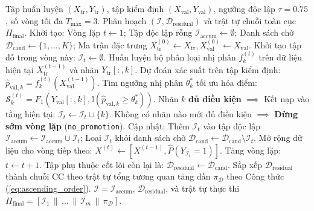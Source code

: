 \documentclass[11pt,a4paper]{article}
\begin{document}
\begin{algorithm}[htbp]
\caption{Quy trình Phân tầng Bóc tách Dữ liệu (Stratified Peeling Partitioning v5.1)}
\label{alg:stratified_peeling}
\begin{algorithmic}[1]
\REQUIRE Tập huấn luyện $(X_{\text{tr}}, Y_{\text{tr}})$, tập kiểm định $(X_{\text{val}}, Y_{\text{val}})$, ngưỡng độc lập $\tau = 0.75$, số vòng tối đa $T_{\max} = 3$.
\ENSURE Phân hoạch $(\mathcal{I}, \mathcal{D}_{\text{residual}})$ và trật tự chuỗi toàn cục $\Pi_{\text{final}}$.
\STATE Khởi tạo: Vòng lặp $t \leftarrow 1$; Tập độc lập rỗng $\mathcal{I}_{\text{accum}} \leftarrow \emptyset$; Danh sách chờ $\mathcal{D}_{\text{cand}} \leftarrow \{1, \dots, K\}$; Ma trận đặc trưng $X_{\text{tr}}^{(0)} \leftarrow X_{\text{tr}}, X_{\text{val}}^{(0)} \leftarrow X_{\text{val}}$.
    \STATE Khởi tạo tập đỗ trong vòng này: $\mathcal{I}_t \leftarrow \emptyset$.
        \STATE Huấn luyện bộ phân loại nhị phân $f_k^{(t)}$ trên dữ liệu hiện tại $X_{\text{tr}}^{(t-1)}$ và nhãn $Y_{\text{tr}}[:, k]$.
        \STATE Dự đoán xác suất trên tập kiểm định: $\hat{p}_{\text{val}, k} = f_k^{(t)}(X_{\text{val}}^{(t-1)})$.
        \STATE Tìm ngưỡng nhị phân $\theta_k^*$ tối ưu hóa điểm: $\mathcal{S}_k^{(t)} = F_1(Y_{\text{val}}[:, k], \mathbb{I}(\hat{p}_{\text{val}, k} \ge \theta_k^*))$.
            \STATE Nhãn $k$ \textbf{đủ điều kiện} $\implies$ Kết nạp vào tầng hiện tại: $\mathcal{I}_t \leftarrow \mathcal{I}_t \cup \{k\}$.
        \ENDIF
    \ENDFOR
        \STATE Không có nhãn nào mới đủ điều kiện $\implies$ \textbf{Dừng sớm vòng lặp} (\texttt{no\_promotion}).
    \ENDIF
    \STATE Cập nhật: Thêm $\mathcal{I}_t$ vào tập độc lập $\mathcal{I}_{\text{accum}} \leftarrow \mathcal{I}_{\text{accum}} \cup \mathcal{I}_t$; Loại $\mathcal{I}_t$ khỏi danh sách chờ $\mathcal{D}_{\text{cand}} \leftarrow \mathcal{D}_{\text{cand}} \setminus \mathcal{I}_t$.
    \STATE Mở rộng dữ liệu cho vòng tiếp theo: $X^{(t)} \leftarrow [X^{(t-1)}, \hat{P}(Y_{\mathcal{I}_t} = 1)]$.
    \STATE Tăng vòng lặp: $t \leftarrow t + 1$.
\ENDWHILE
\STATE Tập phụ thuộc cốt lõi còn lại là: $\mathcal{D}_{\text{residual}} \leftarrow \mathcal{D}_{\text{cand}}$.
\STATE Sắp xếp $\mathcal{D}_{\text{residual}}$ thành chuỗi CC theo trật tự tổng tương quan tăng dần $\pi_{\mathcal{D}}$ theo Công thức (\ref{eq:ascending_order}).
\RETURN $\mathcal{I} = \mathcal{I}_{\text{accum}}$, $\mathcal{D}_{\text{residual}}$, và trật tự thực thi $\Pi_{\text{final}} = [\mathcal{I}_1 \,\|\, \dots \,\|\, \mathcal{I}_m \,\|\, \pi_{\mathcal{D}}]$.
\end{algorithmic}
\end{algorithm}
\end{document}
